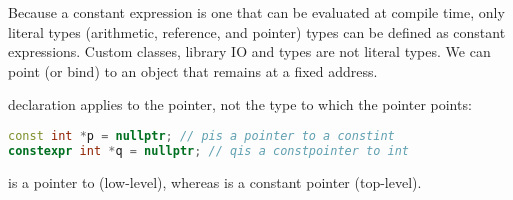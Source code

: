 Because a constant expression is one that can be evaluated at compile time, only literal types (arithmetic, reference, and pointer) types can be defined as constant expressions. Custom classes, library IO and  types are not literal types. We can point (or bind) to an object that remains at a fixed address.

 declaration applies to the pointer, not the type to which the pointer points:
\begin{lstlisting}[language=C++]
const int *p = nullptr; // pis a pointer to a constint
constexpr int *q = nullptr; // qis a constpointer to int
\end{lstlisting}
 is a pointer to  (low-level), whereas  is a constant pointer (top-level).